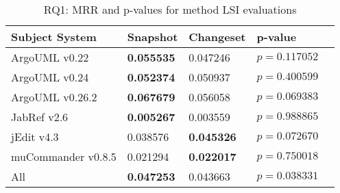 
\begin{table}[t]
\renewcommand{\arraystretch}{1.3}
\footnotesize
\centering
\caption{RQ1: MRR and p-values for method LSI evaluations}
\begin{tabular}{l|ll|ll}
   \toprule
    Subject System & Snapshot & Changeset & p-value  \\
    \midrule

ArgoUML v0.22 & {\bf 0.055535 } & 0.047246 & $p = 0.117052$ \\
ArgoUML v0.24 & {\bf 0.052374 } & 0.050937 & $p = 0.400599$ \\
ArgoUML v0.26.2 & {\bf 0.067679 } & 0.056058 & $p = 0.069383$ \\
JabRef v2.6 & {\bf 0.005267 } & 0.003559 & $p = 0.988865$ \\
jEdit v4.3 & 0.038576 & {\bf 0.045326 } & $p = 0.072670$ \\
muCommander v0.8.5 & 0.021294 & {\bf 0.022017 } & $p = 0.750018$ \\
\midrule
All & {\bf 0.047253 } & 0.043663 & $p = 0.038331$ \\

    \bottomrule
\end{tabular}
\label{table:rq1:method:lsi}
\end{table}

